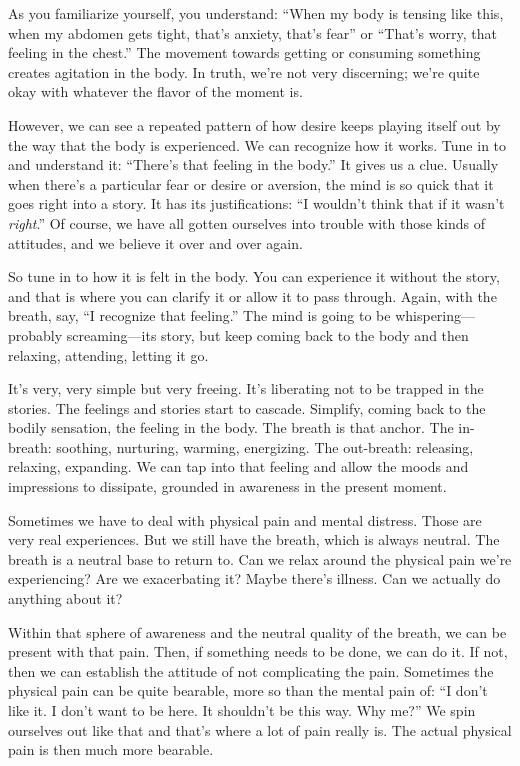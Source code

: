 As you familiarize yourself, you understand: “When my body is tensing
like this, when my abdomen gets tight, that’s anxiety, that’s fear” or
“That’s worry, that feeling in the chest.” The movement towards getting
or consuming something creates agitation in the body. In truth, we’re
not very discerning; we’re quite okay with whatever the flavor of the
moment is.

However, we can see a repeated pattern of how desire keeps playing
itself out by the way that the body is experienced. We can recognize how
it works. Tune in to and understand it: “There’s that feeling in the
body.” It gives us a clue. Usually when there’s a particular fear or
desire or aversion, the mind is so quick that it goes right into a
story. It has its justifications: “I wouldn’t think that if it wasn’t
\emph{right}.” Of course, we have all gotten ourselves into trouble with
those kinds of attitudes, and we believe it over and over again.

So tune in to how it is felt in the body. You can experience it without
the story, and that is where you can clarify it or allow it to pass
through. Again, with the breath, say, “I recognize that feeling.” The
mind is going to be whispering—probably screaming—its story, but keep
coming back to the body and then relaxing, attending, letting it go.

It’s very, very simple but very freeing. It’s liberating not to be
trapped in the stories. The feelings and stories start to cascade.
Simplify, coming back to the bodily sensation, the feeling in the body.
The breath is that anchor. The in-breath: soothing, nurturing, warming,
energizing. The out-breath: releasing, relaxing, expanding. We can tap
into that feeling and allow the moods and impressions to dissipate,
grounded in awareness in the present moment.

Sometimes we have to deal with physical pain and mental distress. Those
are very real experiences. But we still have the breath, which is always
neutral. The breath is a neutral base to return to. Can we relax around
the physical pain we’re experiencing? Are we exacerbating it? Maybe
there’s illness. Can we actually do anything about it?

Within that sphere of awareness and the neutral quality of the breath,
we can be present with that pain. Then, if something needs to be done,
we can do it. If not, then we can establish the attitude of not
complicating the pain. Sometimes the physical pain can be quite
bearable, more so than the mental pain of: “I don’t like it. I don’t
want to be here. It shouldn’t be this way. Why me?” We spin ourselves
out like that and that’s where a lot of pain really is. The actual
physical pain is then much more bearable.


